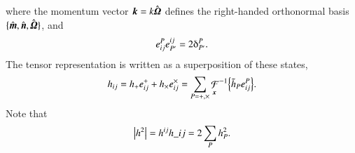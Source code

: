 where the momentum vector $\boldsymbol{k}= k\hat{\boldsymbol{\varOmega}}$ defines the right-handed orthonormal basis $\{\hat{\boldsymbol{m}}, \hat{\boldsymbol{n}}, \hat{\boldsymbol{\varOmega}} \}$, and
\begin{equation}
    e\indices*{^{P}_{ij}} e\indices*{^{ij}_{P'}} = 2\deltaup^{P}_{P'}.
\end{equation}
The tensor representation is written as a superposition of these states,
\begin{equation}
    h_{ij} = h_\polplus e\indices*{^{\polplus}_{ij}} + h_\polcross e\indices*{^{\polcross}_{ij}} = \sum_{P=\polplus, \polcross} 
    {\mathop{\mathcal{F}}_{\vec{x}}}^{-1}{\cclosed{\Ft{h}_P e\indices*{^{P}_{ij}}}}.
\end{equation}
Note that
\begin{equation}
    \abs{h^2 } =  h\^{ij}h\_{ij} = 2 \sum_{P}h_P^2.
\end{equation}



